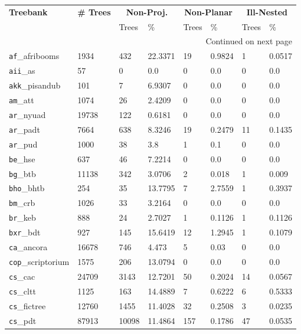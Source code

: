\begin{longtable}{|l|l|l|l|l|l|l|l|}
    \hline 
    \multirow{2}{*}{\textbf{Treebank}} &
    \multirow{2}{*}{\textbf{\# Trees}} & 
    \multicolumn{2}{c|}{\textbf{Non-Proj.}} & 
    \multicolumn{2}{c|}{\textbf{Non-Planar}} & 
    \multicolumn{2}{c|}{\textbf{Ill-Nested}} \\
     & & Trees & \% & Trees & \% & Trees & \% \\
    \hline 
    \endhead
    \hline 
    \multicolumn{8}{|r|}{{Continued on next page}} \\ 
    \hline
    \endfoot
    \endlastfoot
    \hline
    \label{tab:allnpudv2.5}
\texttt{af}\_afribooms & 1934 & 432 & 22.3371 & 19 & 0.9824 & 1 & 0.0517\\
\texttt{aii}\_as & 57 & 0 & 0.0 & 0 & 0.0 & 0 & 0.0\\
\texttt{akk}\_pisandub & 101 & 7 & 6.9307 & 0 & 0.0 & 0 & 0.0\\
\texttt{am}\_att & 1074 & 26 & 2.4209 & 0 & 0.0 & 0 & 0.0\\
\texttt{ar}\_nyuad & 19738 & 122 & 0.6181 & 0 & 0.0 & 0 & 0.0\\
\texttt{ar}\_padt & 7664 & 638 & 8.3246 & 19 & 0.2479 & 11 & 0.1435\\
\texttt{ar}\_pud & 1000 & 38 & 3.8 & 1 & 0.1 & 0 & 0.0\\
\texttt{be}\_hse & 637 & 46 & 7.2214 & 0 & 0.0 & 0 & 0.0\\
\texttt{bg}\_btb & 11138 & 342 & 3.0706 & 2 & 0.018 & 1 & 0.009\\
\texttt{bho}\_bhtb & 254 & 35 & 13.7795 & 7 & 2.7559 & 1 & 0.3937\\
\texttt{bm}\_crb & 1026 & 33 & 3.2164 & 0 & 0.0 & 0 & 0.0\\
\texttt{br}\_keb & 888 & 24 & 2.7027 & 1 & 0.1126 & 1 & 0.1126\\
\texttt{bxr}\_bdt & 927 & 145 & 15.6419 & 12 & 1.2945 & 1 & 0.1079\\
\texttt{ca}\_ancora & 16678 & 746 & 4.473 & 5 & 0.03 & 0 & 0.0\\
\texttt{cop}\_scriptorium & 1575 & 206 & 13.0794 & 0 & 0.0 & 0 & 0.0\\
\texttt{cs}\_cac & 24709 & 3143 & 12.7201 & 50 & 0.2024 & 14 & 0.0567\\
\texttt{cs}\_cltt & 1125 & 163 & 14.4889 & 7 & 0.6222 & 6 & 0.5333\\
\texttt{cs}\_fictree & 12760 & 1455 & 11.4028 & 32 & 0.2508 & 3 & 0.0235\\
\texttt{cs}\_pdt & 87913 & 10098 & 11.4864 & 157 & 0.1786 & 47 & 0.0535\\

\end{longtable}

